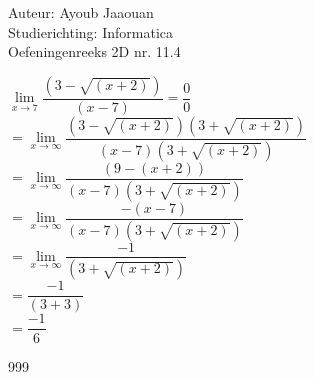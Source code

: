 \documentclass[a4paper]{article}
\begin{document}
\noindent \large Auteur: Ayoub Jaaouan \\
\noindent \large Studierichting: Informatica\\
\noindent \large Oefeningenreeks 2D nr. 11.4\\

\medskip

\normalsize

$\lim\limits_{x \rightarrow 7} \dfrac{(3-\sqrt{(x+2)})}{(x-7)} = \dfrac{0}{0}$\\

$= \lim\limits_{x \rightarrow \infty} \dfrac{(3-\sqrt{(x+2)})(3+\sqrt{(x+2)})}{(x-7)(3+\sqrt{(x+2)})}$\\

$= \lim\limits_{x \rightarrow \infty} \dfrac{(9-(x+2))}{(x-7)(3+\sqrt{(x+2)})}$\\

$= \lim\limits_{x \rightarrow \infty} \dfrac{-(x-7)}{(x-7)(3+\sqrt{(x+2)})}$\\

$= \lim\limits_{x \rightarrow \infty} \dfrac{-1}{(3+\sqrt{(x+2)})}$\\

$= \dfrac{-1}{(3+3)  }$\\

$= \dfrac{-1}{6}$\\


\begin{thebibliography}{999}
\end{thebibliography}
\end{document}

